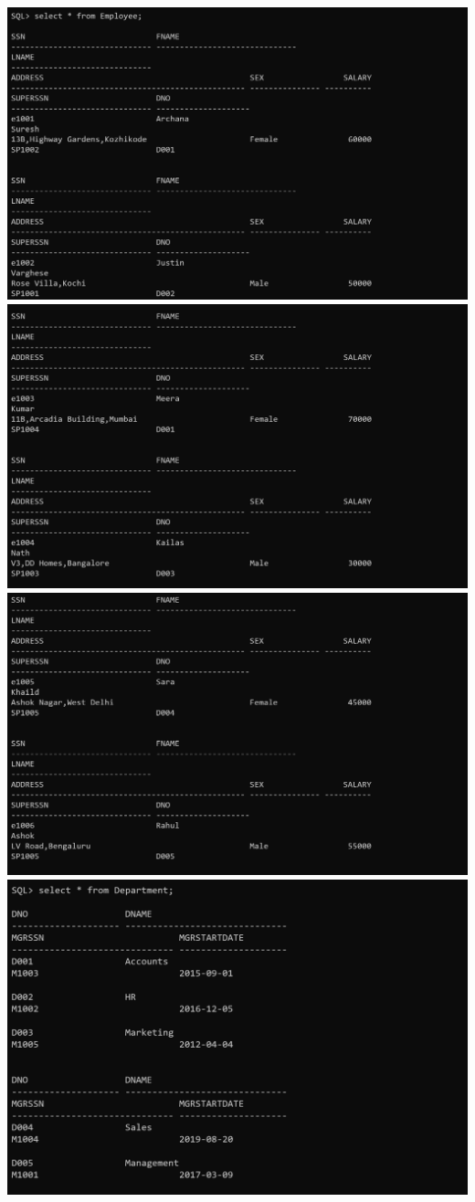 \documentclass[a4paper,12pt]{report}
\begin{document}
\includegraphics[scale=0.4]{C1_emp_1.png}
\includegraphics[scale=0.4]{C1_emp_2.png}
\includegraphics[scale=0.4]{C1_op4.png}
\includegraphics[scale=0.456]{C_Dept1.png}
\end{document}

